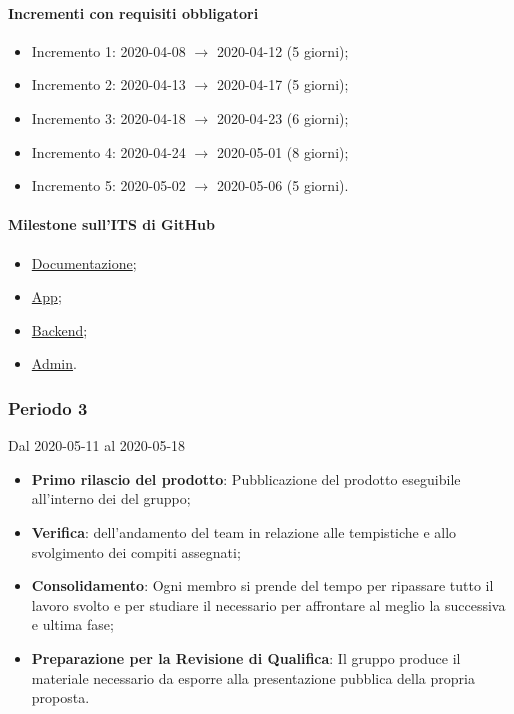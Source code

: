 \paragraph{Incrementi con requisiti obbligatori}
\begin{itemize}
	\item Incremento 1: 2020-04-08 $\rightarrow$ 2020-04-12 (5 giorni);
	\item Incremento 2: 2020-04-13 $\rightarrow$ 2020-04-17 (5 giorni);
	\item Incremento 3: 2020-04-18 $\rightarrow$ 2020-04-23 (6 giorni);
	\item Incremento 4: 2020-04-24 $\rightarrow$ 2020-05-01 (8 giorni);
	\item Incremento 5: 2020-05-02 $\rightarrow$ 2020-05-06 (5 giorni).
\end{itemize}

\paragraph{Milestone sull'ITS di GitHub}
\begin{itemize}
	\item \href{https://github.com/qb-team/Stalker-Documentazione/milestone/12}{Documentazione};
	\item \href{https://github.com/qb-team/Stalker-App/milestone/2}{App};
	\item \href{https://github.com/qb-team/Stalker-Backend/milestone/2}{Backend};
	\item \href{https://github.com/qb-team/Stalker-Admin/milestone/2}{Admin}.
\end{itemize}

\subsubsection{Periodo 3}
Dal 2020-05-11 al 2020-05-18
\begin{itemize}
	\item \textbf{Primo rilascio del prodotto}: Pubblicazione del prodotto eseguibile all'interno dei  del gruppo;
	\item \textbf{Verifica}:  dell'andamento del team in relazione alle tempistiche e allo svolgimento dei compiti assegnati;
	\item \textbf{Consolidamento}: Ogni membro si prende del tempo per ripassare tutto il lavoro svolto e per studiare il necessario per affrontare al meglio la successiva e ultima fase;
	\item \textbf{Preparazione per la Revisione di Qualifica}: Il gruppo produce il materiale necessario da esporre alla presentazione pubblica della propria proposta.
\end{itemize}
